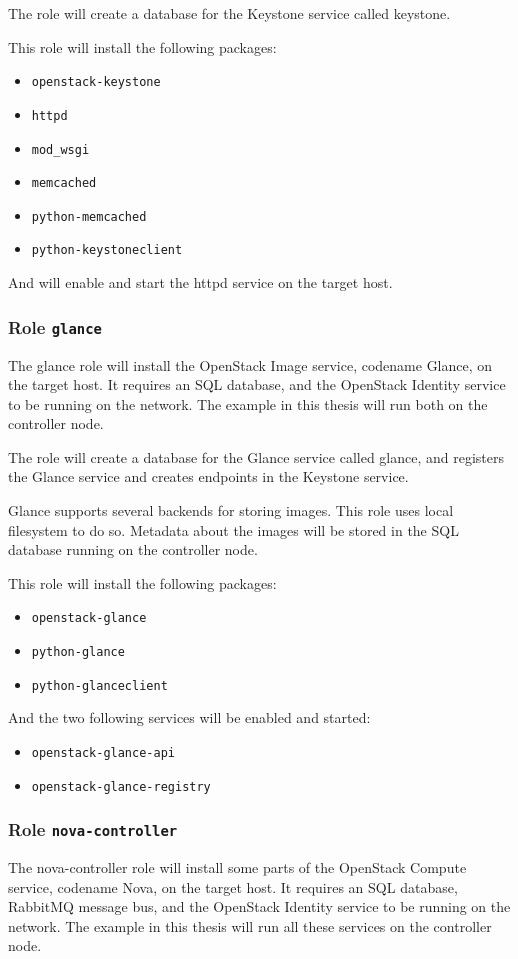 The role will create a database for the Keystone service called keystone.

This role will install the following packages:
\begin{itemize}
  \item{\texttt{openstack-keystone}}
  \item{\texttt{httpd}}
  \item{\texttt{mod\_wsgi}}
  \item{\texttt{memcached}}
  \item{\texttt{python-memcached}}
  \item{\texttt{python-keystoneclient}}
\end{itemize}
And will enable and start the httpd service on the target host.



\subsubsection*{Role \texttt{glance}}
The glance role will install the OpenStack Image service, codename Glance, on the target host. It requires an SQL database, and the OpenStack Identity service to be running on the network. The example in this thesis will run both on the controller node.

The role will create a database for the Glance service called glance, and registers the Glance service and creates endpoints in the Keystone service.

Glance supports several backends for storing images. This role uses local filesystem to do so. Metadata about the images will be stored in the SQL database running on the controller node.

This role will install the following packages:
\begin{itemize}
  \item{\texttt{openstack-glance}}
  \item{\texttt{python-glance}}
  \item{\texttt{python-glanceclient}}
\end{itemize}
And the two following services will be enabled and started:
\begin{itemize}
  \item{\texttt{openstack-glance-api}}
  \item{\texttt{openstack-glance-registry}}
\end{itemize}


\subsubsection*{Role \texttt{nova-controller}}
The nova-controller role will install some parts of the OpenStack Compute service, codename Nova, on the target host. It requires an SQL database, RabbitMQ message bus, and the OpenStack Identity service to be running on the network. The example in this thesis will run all these services on the controller node.


